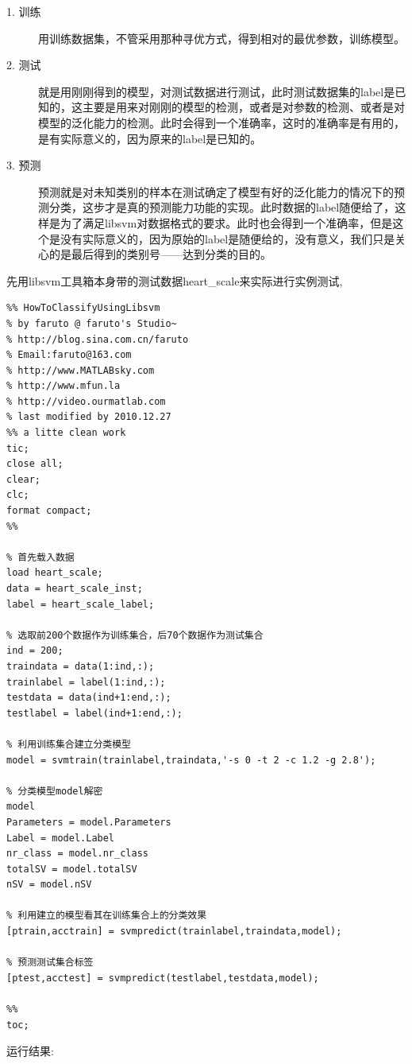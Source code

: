 \documentclass[12pt]{article}
\numberwithin{equation}{section}%
\begin{document}
\begin{description}
\item[1. 训练] 用训练数据集，不管采用那种寻优方式，得到相对的最优参数，训练模型。

\item[2. 测试] 就是用刚刚得到的模型，对测试数据进行测试，此时测试数据集的label是已知的，这主要是用来对刚刚的模型的检测，或者是对参数的检测、或者是对模型的泛化能力的检测。此时会得到一个准确率，这时的准确率是有用的，是有实际意义的，因为原来的label是已知的。

\item[3. 预测] 预测就是对未知类别的样本在测试确定了模型有好的泛化能力的情况下的预测分类，这步才是真的预测能力功能的实现。此时数据的label随便给了，这样是为了满足libsvm对数据格式的要求。此时也会得到一个准确率，但是这个是没有实际意义的，因为原始的label是随便给的，没有意义，我们只是关心的是最后得到的类别号——达到分类的目的。
\end{description}

先用libsvm工具箱本身带的测试数据heart\_scale来实际进行实例测试, 

\begin{lstlisting}
%% HowToClassifyUsingLibsvm
% by faruto @ faruto's Studio~
% http://blog.sina.com.cn/faruto
% Email:faruto@163.com
% http://www.MATLABsky.com
% http://www.mfun.la
% http://video.ourmatlab.com
% last modified by 2010.12.27
%% a litte clean work
tic;
close all;
clear;
clc;
format compact;
%% 

% 首先载入数据
load heart_scale;
data = heart_scale_inst;
label = heart_scale_label;

% 选取前200个数据作为训练集合，后70个数据作为测试集合
ind = 200;
traindata = data(1:ind,:);
trainlabel = label(1:ind,:);
testdata = data(ind+1:end,:);
testlabel = label(ind+1:end,:);

% 利用训练集合建立分类模型
model = svmtrain(trainlabel,traindata,'-s 0 -t 2 -c 1.2 -g 2.8');

% 分类模型model解密
model
Parameters = model.Parameters
Label = model.Label
nr_class = model.nr_class
totalSV = model.totalSV
nSV = model.nSV 

% 利用建立的模型看其在训练集合上的分类效果
[ptrain,acctrain] = svmpredict(trainlabel,traindata,model);

% 预测测试集合标签
[ptest,acctest] = svmpredict(testlabel,testdata,model);

%%
toc;
\end{lstlisting}

运行结果:
\end{document}
